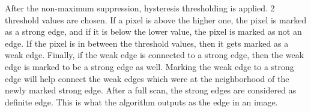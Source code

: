 \documentclass[12pt]{report}%
\theoremstyle{definition}  %
\begin{document}
After the non-maximum suppression, hysteresis thresholding is applied. 2 threshold values are chosen. If a pixel is above the higher one, the pixel is marked as a strong edge, and if it is below the lower value, the pixel is marked as not an edge. If the pixel is in between the threshold values, then it gets marked as a weak edge. Finally, if the weak edge is connected to a strong edge, then the weak edge is marked to be a strong edge as well. Marking the weak edge to a strong edge will help connect the weak edges which were at the neighborhood of the newly marked strong edge. After a full scan, the strong edges are considered as definite edge. This is what the algorithm outputs as the edge in an image.
\end{document}
